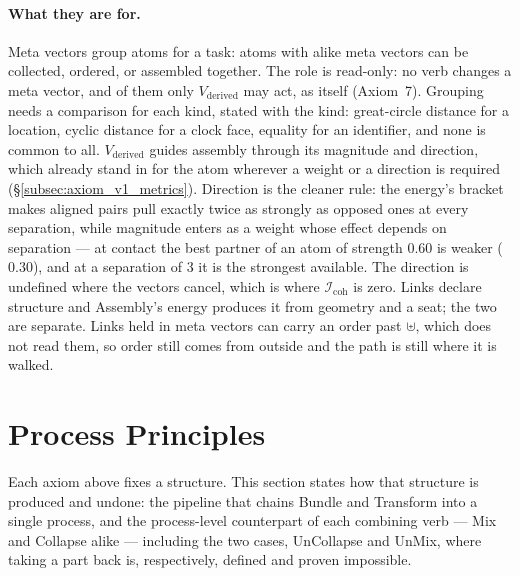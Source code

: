 \documentclass[12pt, a4paper]{article}
\begin{document}
\paragraph{What they are for.} Meta vectors group atoms for a task: atoms
with alike meta vectors can be collected, ordered, or assembled
together. The role is read-only: no verb changes a meta vector, and of them only
$V_{\text{derived}}$ may act, as itself (Axiom~7). Grouping needs a comparison for each kind, stated with the kind:
great-circle distance for a location, cyclic distance for a clock face,
equality for an identifier, and none is common to all.
$V_{\text{derived}}$ guides assembly through its magnitude and
direction, which already stand in for the atom wherever a weight or a
direction is required (\S\ref{subsec:axiom_v1_metrics}). Direction is
the cleaner rule: the energy's bracket makes aligned pairs pull exactly
twice as strongly as opposed ones at every separation, while magnitude
enters as a weight whose effect depends on separation --- at contact the
best partner of an atom of strength $0.60$ is weaker ($0.30$), and at a
separation of $3$ it is the strongest available. The direction is
undefined where the vectors cancel, which is where $\mathcal{I}_{\mathrm{coh}}$ is
zero. Links declare structure and Assembly's energy produces it from
geometry and a seat; the two are separate. Links held in meta vectors
can carry an order past $\uplus$, which does not read them, so order
still comes from outside and the path is still where it is walked.

\section{Process Principles}
\label{sec:process_principles}
Each axiom above fixes a structure. This section states how that
structure is produced and undone: the pipeline that chains Bundle
and Transform into a single process, and the process-level
counterpart of each combining verb --- Mix and Collapse alike ---
including the two cases, UnCollapse and UnMix, where taking a part back is, respectively, defined and proven impossible.
\end{document}
